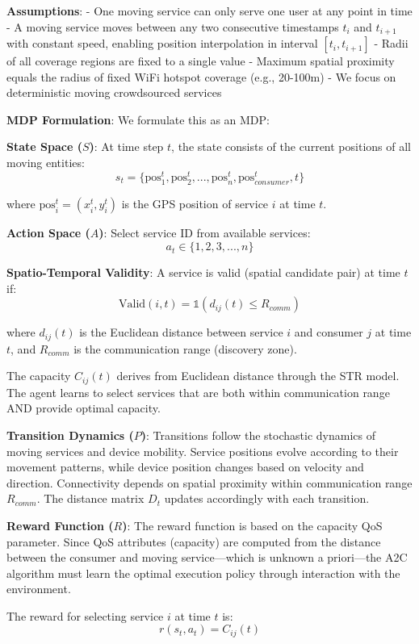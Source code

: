 \documentclass[
  10pt,
  twocolumn,
]{article}
\begin{document}
\textbf{Assumptions}: - One moving service can only serve one user at
any point in time - A moving service moves between any two consecutive
timestamps \(t_i\) and \(t_{i+1}\) with constant speed, enabling
position interpolation in interval \([t_i, t_{i+1}]\) - Radii of all
coverage regions are fixed to a single value - Maximum spatial proximity
equals the radius of fixed WiFi hotspot coverage (e.g., 20-100m) - We
focus on deterministic moving crowdsourced services

\textbf{MDP Formulation}: We formulate this as an MDP:

\textbf{State Space (\(S\))}: At time step \(t\), the state consists of
the current positions of all moving entities:
\[s_t = \{\text{pos}_1^t, \text{pos}_2^t, ..., \text{pos}_n^t, \text{pos}_{consumer}^t, t\}\]

where \(\text{pos}_i^t = (x_i^t, y_i^t)\) is the GPS position of service
\(i\) at time \(t\).

\textbf{Action Space (\(A\))}: Select service ID from available
services: \[a_t \in \{1, 2, 3, ..., n\}\]

\textbf{Spatio-Temporal Validity}: A service is valid (spatial candidate
pair) at time \(t\) if:
\[\text{Valid}(i, t) = \mathbb{1}(d_{ij}(t) \leq R_{comm})\]

where \(d_{ij}(t)\) is the Euclidean distance between service \(i\) and
consumer \(j\) at time \(t\), and \(R_{comm}\) is the communication
range (discovery zone).

The capacity \(C_{ij}(t)\) derives from Euclidean distance through the
STR model. The agent learns to select services that are both within
communication range AND provide optimal capacity.

\textbf{Transition Dynamics (\(P\))}: Transitions follow the stochastic
dynamics of moving services and device mobility. Service positions
evolve according to their movement patterns, while device position
changes based on velocity and direction. Connectivity depends on spatial
proximity within communication range \(R_{comm}\). The distance matrix
\(D_t\) updates accordingly with each transition.

\textbf{Reward Function (\(R\))}: The reward function is based on the
capacity QoS parameter. Since QoS attributes (capacity) are computed
from the distance between the consumer and moving service---which is
unknown a priori---the A2C algorithm must learn the optimal execution
policy through interaction with the environment.

The reward for selecting service \(i\) at time \(t\) is:
\[r(s_t, a_t) = C_{ij}(t)\]
\end{document}
